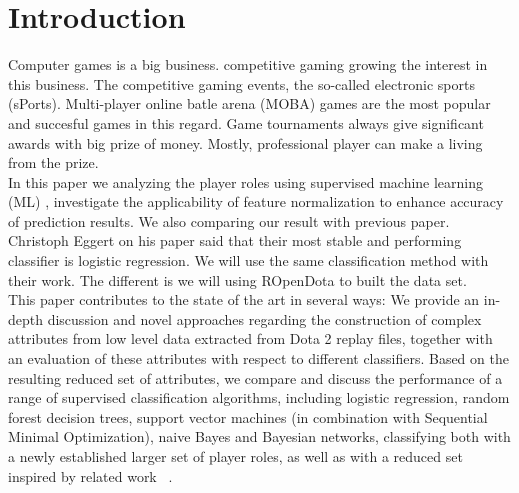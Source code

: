 \section{Introduction}

Computer games is a big business. competitive gaming growing the interest in this business. The competitive gaming events, the so-called electronic sports (sPorts). Multi-player online batle arena (MOBA) games are the most popular and succesful games in this regard. Game tournaments always give significant awards with big prize of money. Mostly, professional player can make a living from the prize. 
\\
In this paper we analyzing the player roles using supervised machine learning (ML) , investigate the applicability of feature normalization to enhance accuracy of prediction results. We also comparing our result with previous paper. Christoph Eggert on his paper said that their most stable and performing classifier is logistic regression. We will use the same classification method with their work. The different is we will using ROpenDota to built the data set.
\\
This paper contributes to the state of the art in several ways: We provide an in-depth discussion and novel approaches regarding the construction of complex attributes from low level data extracted from Dota 2 replay files, together with an evaluation of these attributes with respect to different classifiers. Based on the resulting reduced set of attributes, we compare and discuss the performance of a range of supervised classification algorithms, including logistic regression, random forest decision trees, support vector machines (in combination with Sequential Minimal Optimization), naive Bayes and Bayesian networks, classifying both with a newly established larger set of player roles, as well as with a reduced set inspired by related work ~\cite{eggert2015classification}.